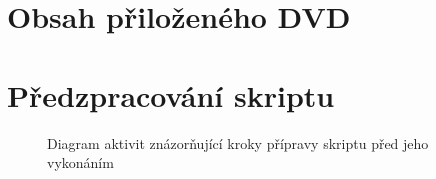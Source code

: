 
\chapter{Obsah přiloženého DVD}
\label{Annex.dvdContent}

\chapter{Předzpracování skriptu}
\label{Annex.ScriptPreprocessing}

\begin{figure}[H]
  \begin{center}
    \caption{Diagram aktivit znázorňující kroky přípravy skriptu před jeho vykonáním}
    \label{Figure.ScriptPreparationSteps}
  \end{center}
\end{figure}

